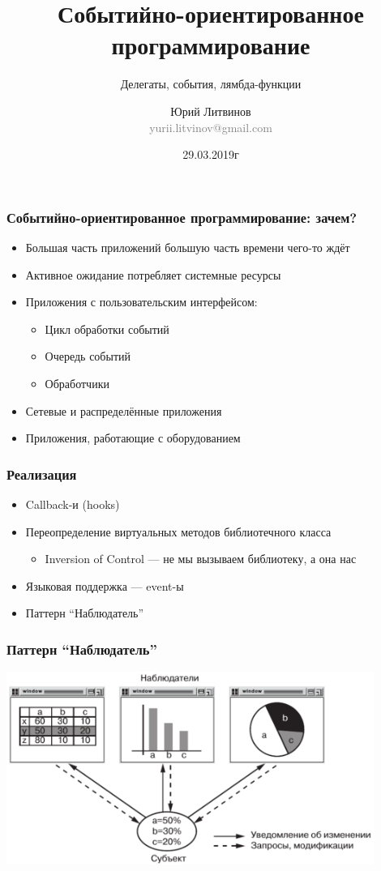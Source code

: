 \documentclass[xetex,mathserif,serif]{beamer}
\title{Событийно-ориентированное программирование}
\subtitle{Делегаты, события, лямбда-функции}
\author[Юрий Литвинов]{Юрий Литвинов\\\small{\textcolor{gray}{yurii.litvinov@gmail.com}}}
\date{29.03.2019г}
\begin{document}
	\frame{\titlepage}

		\begin{frame}
		\frametitle{Событийно-ориентированное программирование: зачем?}
		\begin{itemize}
			\item Большая часть приложений большую часть времени чего-то ждёт
			\item Активное ожидание потребляет системные ресурсы
			\item Приложения с пользовательским интерфейсом:
			\begin{itemize}
				\item Цикл обработки событий
				\item Очередь событий
				\item Обработчики
			\end{itemize}
			\item Сетевые и распределённые приложения
			\item Приложения, работающие с оборудованием
		\end{itemize}
	\end{frame}

	\begin{frame}
		\frametitle{Реализация}
		\begin{itemize}
			\item Callback-и (hooks)
			\item Переопределение виртуальных методов библиотечного класса
			\begin{itemize}
				\item Inversion of Control --- не мы вызываем библиотеку, а она нас
			\end{itemize}
			\item Языковая поддержка --- event-ы
			\item Паттерн ``Наблюдатель''
		\end{itemize}
	\end{frame}

	\begin{frame}
		\frametitle{Паттерн ``Наблюдатель''}
		\begin{center}
			\includegraphics[width=0.9\textwidth]{observerExample.png}
		\end{center}
	\end{frame}
\end{document}
